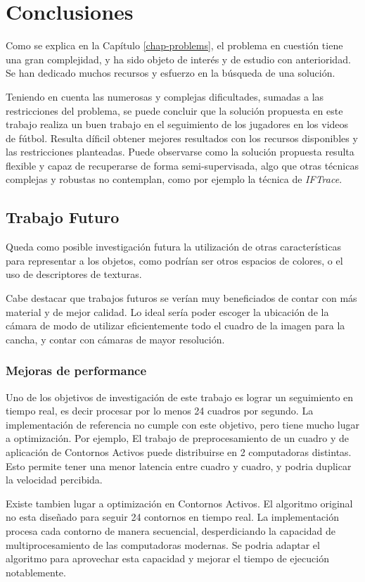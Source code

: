 \chapter{Conclusiones}
\label{chap-conclusion}

Como se explica en la Capítulo \ref{chap-problems}, el problema en cuestión
tiene una gran complejidad, y ha sido objeto de interés y de estudio con
anterioridad. Se han dedicado muchos recursos y esfuerzo en la búsqueda de una
solución.

Teniendo en cuenta las numerosas y complejas dificultades, sumadas a las
restricciones del problema, se puede concluir que la solución propuesta en este
trabajo realiza un buen trabajo en el seguimiento de los jugadores en los
videos de fútbol. Resulta díficil obtener mejores resultados con los recursos
disponibles y las restricciones planteadas. Puede observarse como la solución
propuesta resulta flexible y capaz de recuperarse de forma semi-supervisada,
algo que otras técnicas complejas y robustas no contemplan, como por ejemplo la
técnica de \textit{IFTrace}.


\section{Trabajo Futuro}

Queda como posible investigación futura la utilización de otras características
para representar a los objetos, como podrían ser otros espacios de colores, o
el uso de descriptores de texturas.

Cabe destacar que trabajos futuros se verían muy beneficiados de contar con más
material y de mejor calidad. Lo ideal sería poder escoger la ubicación de la
cámara de modo de utilizar eficientemente todo el cuadro de la imagen para la
cancha, y contar con cámaras de mayor resolución.

\subsection{Mejoras de performance}

Uno de los objetivos de investigación de este trabajo es lograr un seguimiento en
tiempo real, es decir procesar por lo menos 24 cuadros por segundo. La implementación
de referencia no cumple con este objetivo, pero tiene mucho lugar a optimización. 
Por ejemplo, El trabajo de preprocesamiento de un cuadro y de aplicación de Contornos
Activos puede distribuirse en 2 computadoras distintas. Esto permite tener una menor
latencia entre cuadro y cuadro, y podria duplicar la velocidad percibida. 

Existe tambien lugar a optimización en Contornos Activos. El algoritmo original no
esta diseñado para seguir 24 contornos en tiempo real. La implementación procesa
cada contorno de manera secuencial, desperdiciando la capacidad de multiprocesamiento
de las computadoras modernas. Se podria adaptar el algoritmo para aprovechar esta
capacidad y mejorar el tiempo de ejecución notablemente.

